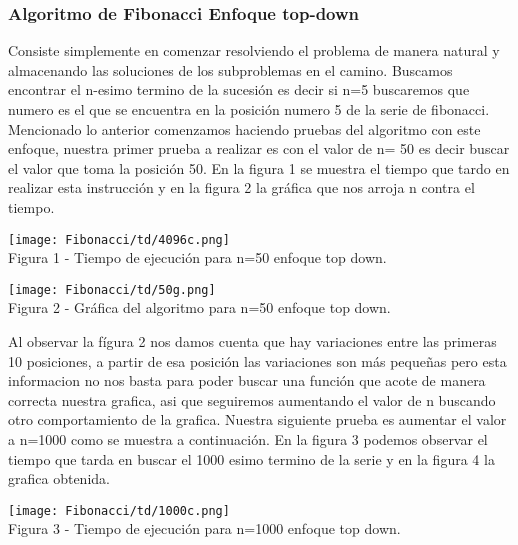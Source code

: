 \documentclass[12pt,twoside]{article}
\begin{document}
\subsubsection{Algoritmo de Fibonacci Enfoque  top-down}
Consiste simplemente en comenzar resolviendo el problema de manera natural y almacenando las soluciones de los subproblemas en el camino. \newline
Buscamos encontrar el n-esimo termino de la sucesión es decir si n=5 buscaremos que numero es el que se encuentra en la posición numero 5 de la serie de fibonacci.\newline
Mencionado lo anterior comenzamos haciendo pruebas del algoritmo con este enfoque, nuestra primer prueba a realizar es con el valor de n= 50 es decir buscar el valor que toma la posición 50. En la figura 1 se muestra el tiempo que tardo en realizar esta instrucción y en la figura 2 la gráfica que nos arroja n contra el tiempo.
\begin{center}
    \texttt{[image: Fibonacci/td/4096c.png]}\\
    Figura 1 - Tiempo de ejecución para n=50 enfoque top down.
\end{center}

\begin{center}
    \texttt{[image: Fibonacci/td/50g.png]}\\
    Figura 2 - Gráfica del algoritmo para n=50 enfoque top down.
\end{center}
\newline
Al observar la fígura 2 nos damos cuenta que hay variaciones entre las primeras 10 posiciones, a partir de esa posición las variaciones son más pequeñas pero esta informacion no nos basta para poder buscar una función que acote de manera correcta nuestra grafica, asi que seguiremos aumentando el valor de n buscando otro comportamiento de la grafica. Nuestra siguiente prueba es aumentar el valor a n=1000 como se muestra a continuación. En la figura 3 podemos observar el tiempo que tarda en buscar el 1000 esimo termino de la serie y en la figura 4 la grafica obtenida.
\begin{center}
    \texttt{[image: Fibonacci/td/1000c.png]}\\
    Figura 3 - Tiempo de ejecución para n=1000 enfoque top down.
\end{center}
\end{document}
